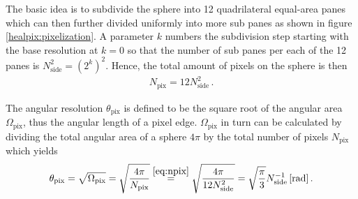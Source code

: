 The basic idea is to subdivide the sphere into 12 quadrilateral equal-area panes which can then further divided uniformly into more sub panes as shown in figure \ref{healpix:pixelization}. A parameter $k$ numbers the subdivision step starting with the base resolution at $k=0$ so that the number of sub panes per each of the 12 panes is $N_{\text{side}}^2=\left(2^k\right)^2$. Hence, the total amount of pixels on the sphere is then \cite{healpix:paper}
\begin{align}
N_\text{pix} = 12N_\text{side}^2\,.
\label{eq:npix}
\end{align}

The angular resolution $\theta_\text{pix}$ is defined to be the square root of the angular area $\Omega_\text{pix}$, thus the angular length of a pixel edge. $\Omega_\text{pix}$ in turn can be calculated by dividing the total angular area of a sphere $4\pi$ by the total number of pixels $N_\text{pix}$ which yields \cite{healpix:paper}
\begin{align}
	\theta_\text{pix} = \sqrt{\Omega_\text{pix}} = \sqrt{\frac{4\pi}{N_\text{pix}}} \overset{\eqref{eq:npix}}{=} \sqrt{\frac{4\pi}{12N_\text{side}^2}} = \sqrt{\frac{\pi}{3}}N_\text{side}^{-1}\,[\si{\radian}]\,.
\end{align} 

